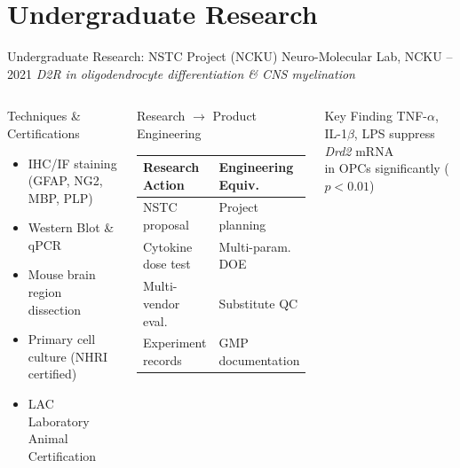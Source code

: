 \documentclass[aspectratio=169,10pt]{beamer}
\begin{document}
\section{Undergraduate Research}
\begin{frame}{Undergraduate Research: NSTC Project (NCKU)}
  {\small Neuro-Molecular Lab, NCKU --2021 \quad
   \textit{D2R in oligodendrocyte differentiation \& CNS myelination}}

  \vspace{0.1cm}
  \begin{columns}[T]
      \begin{block}{Techniques \& Certifications}
        \small
        \begin{itemize}
          \item IHC/IF staining (GFAP, NG2, MBP, PLP)
          \item Western Blot \& qPCR
          \item Mouse brain region dissection
          \item Primary cell culture (NHRI certified)
          \item LAC Laboratory Animal Certification
        \end{itemize}
      \end{block}

      \begin{block}{Research $\to$ Product Engineering}
        \footnotesize
        \begin{tabular}{p{2.6cm}p{2.7cm}}
          \toprule
          Research Action & Engineering Equiv. \\
          \midrule
          NSTC proposal       & Project planning \\
          Cytokine dose test  & Multi-param. DOE \\
          Multi-vendor eval.  & Substitute QC \\
          Experiment records  & GMP documentation \\
          \bottomrule
        \end{tabular}
      \end{block}
      \vspace{0.1cm}
      \begin{exampleblock}{Key Finding}
        \footnotesize
        TNF-$\alpha$, IL-1$\beta$, LPS suppress \textit{Drd2} mRNA\\
        in OPCs significantly ($p < 0.01$)
      \end{exampleblock}
  \end{columns}
\end{frame}
\end{document}
